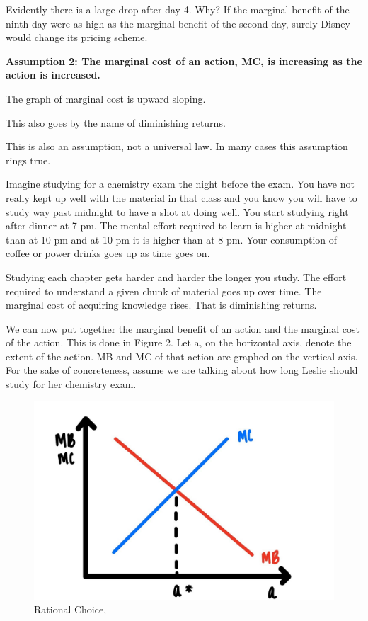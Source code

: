 \documentclass[
]{book}
\begin{document}
Evidently there is a large drop after day 4. Why? If the marginal benefit of the ninth day were as high as the marginal benefit of the second day, surely Disney would change its pricing scheme.

\textbf{Assumption 2: The marginal cost of an action, MC, is increasing as the action is increased.}

The graph of marginal cost is upward sloping.

This also goes by the name of diminishing returns.

This is also an assumption, not a universal law. In many cases this assumption rings true.

Imagine studying for a chemistry exam the night before the exam. You have not really kept up well with the material in that class and you know you will have to study way past midnight to have a shot at doing well. You start studying right after dinner at 7 pm. The mental effort required to learn is higher at midnight than at 10 pm and at 10 pm it is higher than at 8 pm. Your consumption of coffee or power drinks goes up as time goes on.

Studying each chapter gets harder and harder the longer you study. The effort required to understand a given chunk of material goes up over time. The marginal cost of acquiring knowledge rises. That is diminishing returns.

We can now put together the marginal benefit of an action and the marginal cost of the action. This is done in Figure 2. Let a, on the horizontal axis, denote the extent of the action. MB and MC of that action are graphed on the vertical axis. For the sake of concreteness, assume we are talking about how long Leslie should study for her chemistry exam.

\begin{figure}

{\centering \includegraphics[width=0.75\linewidth]{img/ch2/fig2} 

}

\caption{Rational Choice,}\label{fig:fig202}
\end{figure}
\end{document}

